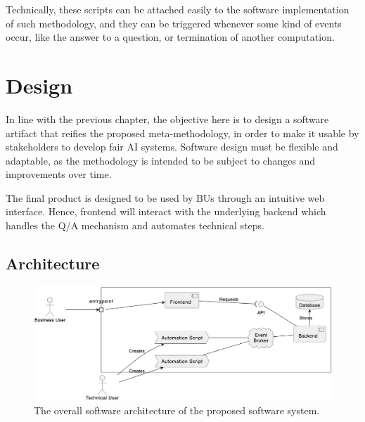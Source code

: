 \documentclass[12pt,a4paper,openright,twoside]{book}
\begin{document}
Technically, these scripts can be attached easily to the  software implementation of such methodology, and they can be triggered whenever some kind of events occur, like the answer to a question, or termination of another computation.






\chapter{Design}%
\label{chap:design}

In line with the previous chapter, the objective here is to design a software artifact that reifies the proposed meta-methodology, in order to make it usable by stakeholders to develop fair \ac{AI} systems.
%
Software design must be flexible and adaptable, as the methodology is intended to be subject to changes and improvements over time.

The final product is designed to be used by \acfp{BU} through an intuitive web interface.
%
Hence, frontend will interact with the underlying backend which handles the \ac{Q/A} mechanism and automates technical steps.

\section{Architecture}

\begin{figure}
    \centering
    \includegraphics[width=\linewidth]{figures/diagrams/architecture.png}
    \caption{
        The overall software architecture of the proposed software system.
    }
    \label{fig:architecture}
\end{figure}
\end{document}

